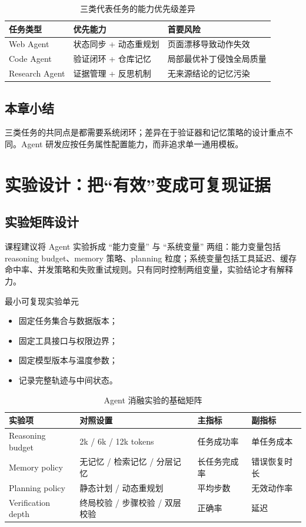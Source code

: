 \documentclass[a4paper]{article}
\begin{document}
\begin{table}[H]
\centering
\begin{tabular}{p{2.7cm}p{3.9cm}p{4.4cm}}
\toprule
\textbf{任务类型} & \textbf{优先能力} & \textbf{首要风险} \\
\midrule
Web Agent & 状态同步 + 动态重规划 & 页面漂移导致动作失效 \\
Code Agent & 验证闭环 + 仓库记忆 & 局部最优补丁侵蚀全局质量 \\
Research Agent & 证据管理 + 反思机制 & 无来源结论的记忆污染 \\
\bottomrule
\end{tabular}
\caption{三类代表任务的能力优先级差异}
\end{table}

\subsection{本章小结}
三类任务的共同点是都需要系统闭环；差异在于验证器和记忆策略的设计重点不同。Agent 研发应按任务属性配置能力，而非追求单一通用模板。

\section{实验设计：把“有效”变成可复现证据}

\subsection{实验矩阵设计}
课程建议将 Agent 实验拆成 ``能力变量'' 与 ``系统变量'' 两组：能力变量包括 reasoning budget、memory 策略、planning 粒度；系统变量包括工具延迟、缓存命中率、并发策略和失败重试规则。只有同时控制两组变量，实验结论才有解释力。

\begin{knowledgebox}{最小可复现实验单元}
\begin{itemize}
    \item 固定任务集合与数据版本；
    \item 固定工具接口与权限边界；
    \item 固定模型版本与温度参数；
    \item 记录完整轨迹与中间状态。
\end{itemize}
\end{knowledgebox}

\begin{table}[H]
\centering
\begin{tabular}{p{3.1cm}p{3.3cm}p{2.7cm}p{2.2cm}}
\toprule
\textbf{实验项} & \textbf{对照设置} & \textbf{主指标} & \textbf{副指标} \\
\midrule
Reasoning budget & 2k / 6k / 12k tokens & 任务成功率 & 单任务成本 \\
Memory policy & 无记忆 / 检索记忆 / 分层记忆 & 长任务完成率 & 错误恢复时长 \\
Planning policy & 静态计划 / 动态重规划 & 平均步数 & 无效动作率 \\
Verification depth & 终局校验 / 步骤校验 / 双层校验 & 正确率 & 延迟 \\
\bottomrule
\end{tabular}
\caption{Agent 消融实验的基础矩阵}
\end{table}
\end{document}
